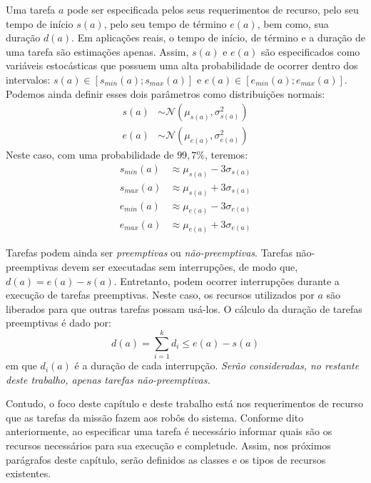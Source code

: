         Uma tarefa $a$ pode ser especificada pelos seus requerimentos de recurso, pelo seu tempo de início $s(a)$, pelo seu tempo de término $e(a)$, bem como, sua duração $d(a)$. Em aplicações reais, o tempo de início, de término e a duração de uma tarefa são estimações apenas. Assim, $s(a)$ e $e(a)$ são especificados como variáveis estocásticas que possuem uma alta probabilidade de ocorrer dentro dos intervalos: $s(a) \in [s_{min}(a); s_{max}(a)]$ e $e(a) \in [e_{min}(a); e_{max}(a)]$. Podemos ainda definir esses dois parâmetros como distribuições normais: 
        $$
            \begin{aligned}
                s(a) &\sim \mathcal{N}(\mu_{s(a)}, \sigma_{s(a)}^2) \\
                e(a) &\sim \mathcal{N}(\mu_{e(a)}, \sigma_{e(a)}^2)
            \end{aligned}
        $$
        Neste caso, com uma probabilidade de $99,7\%$, teremos: 
        $$
            \begin{aligned}
                s_{min}(a) &\approx \mu_{s(a)} - 3\sigma_{s(a)} \\
                s_{max}(a) &\approx \mu_{s(a)} + 3\sigma_{s(a)} \\
                e_{min}(a) &\approx \mu_{e(a)} - 3\sigma_{e(a)} \\
                e_{max}(a) &\approx \mu_{e(a)} + 3\sigma_{e(a)}
            \end{aligned}
        $$
        
        Tarefas podem ainda ser \textit{preemptivas} ou \textit{não-preemptivas}. Tarefas não-preemptivas devem ser executadas sem interrupções, de modo que, $d(a) = e(a) - s(a)$. Entretanto, podem ocorrer interrupções durante a execução de tarefas preemptivas. Neste caso, os recursos utilizados por $a$ são liberados para que outras tarefas possam usá-los. O cálculo da duração de tarefas preemptivas é dado por:
        $$
            d(a) = \sum\limits_{i=1}^k d_i \leq e(a) - s(a)
        $$
        em que $d_i(a)$ é a duração de cada interrupção. \emph{\color{red}Serão consideradas, no restante deste trabalho, apenas tarefas não-preemptivas.}
        
        Contudo, o foco deste capítulo e deste trabalho está nos requerimentos de recurso que as tarefas da missão fazem aos robôs do sistema. Conforme dito anteriormente, ao especificar uma tarefa é necessário informar quais são os recursos necessários para sua execução e completude. Assim, nos próximos parágrafos deste capítulo, serão definidos as classes e os tipos de recursos existentes.

